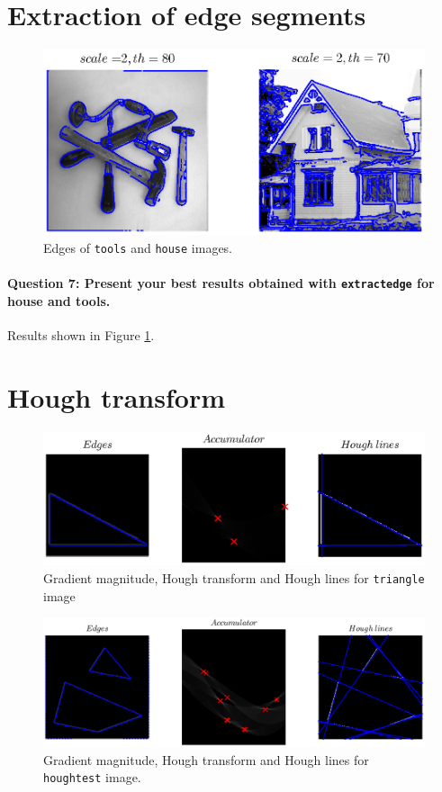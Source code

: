 \documentclass[12pt]{article}
\begin{document}
\section{Extraction of edge segments}

\begin{figure}[htbp]
 \centering
 \includegraphics[width=\textwidth]{q6}
 \caption{Edges of \texttt{tools} and \texttt{house} images.}
 \label{fig:q45}
\end{figure}

\paragraph{Question 7: Present your best results obtained with \texttt{extractedge} for house and tools.}
Results shown in Figure \ref{fig:q45}.


\section{Hough transform}


\begin{figure}[htbp]
 \centering
 \includegraphics[width=\textwidth]{q8a}
 \caption{Gradient magnitude, Hough transform and Hough lines for \texttt{triangle} image}
 \label{fig:q8a}
\end{figure}

\begin{figure}[htbp]
 \centering
 \includegraphics[width=\textwidth]{q8b}
 \caption{Gradient magnitude, Hough transform and Hough lines for \texttt{houghtest} image.}
 \label{fig:q8b}
\end{figure}
\end{document}
